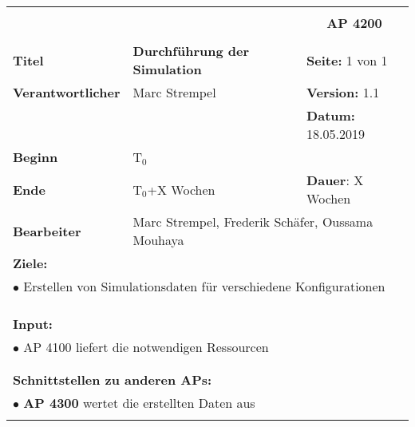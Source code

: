 \clearpage
\begin{table}[!h]
 \begin{center}
  \begin{tabular}{|p{35mm}||p{55mm}|p{50mm}||p{40mm}|}
   \hline
   \multicolumn{3}{|l||}{\textbf{}} & \multicolumn{1}{c|}{}\\
   \multicolumn{3}{|l||}{\textbf{}} & \multicolumn{1}{c|}{\textbf{AP 4200}}\\
   \multicolumn{3}{|l||}{\textbf{}} & \multicolumn{1}{c|}{}\\
   \hline\hline
   \textbf{Titel} & \multicolumn{2}{p{7cm}||}{\textbf{Durchführung der Simulation}} & \textbf{Seite:} 1 von 1\\
   \hline
   \textbf{Verantwortlicher} & \multicolumn{2}{l||}{Marc Strempel} & \textbf{Version:} 1.1\\
   \hline
   \multicolumn{3}{|l||}{} & \textbf{Datum:} 18.05.2019\\
   \hline\hline
   \textbf{Beginn} & \multicolumn{2}{l||}{T$_0$} & \\
   \hline
   \textbf{Ende} & \multicolumn{2}{l||}{T$_0$+X Wochen} & \textbf{Dauer}: X Wochen\\
   \hline\hline
   \textbf{Bearbeiter} & \multicolumn{3}{l|}{Marc Strempel, Frederik Schäfer, Oussama Mouhaya}\\
   \hline\hline
   \multicolumn{4}{|p{150mm}|}{\textbf{Ziele:}}\\
   \multicolumn{4}{|p{150mm}|}{$\bullet$ Erstellen von Simulationsdaten für verschiedene Konfigurationen}\\
   \multicolumn{4}{|p{150mm}|}{}\\
   \multicolumn{4}{|p{150mm}|}{}\\
   \multicolumn{4}{|p{150mm}|}{}\\
   \multicolumn{4}{|p{150mm}|}{\textbf{Input:}}\\
   \multicolumn{4}{|p{150mm}|}{$\bullet$ AP 4100 liefert die notwendigen Ressourcen}\\
   \multicolumn{4}{|p{150mm}|}{}\\
   \multicolumn{4}{|p{150mm}|}{}\\
   \multicolumn{4}{|p{150mm}|}{\textbf{Schnittstellen zu anderen APs:}}\\
   \multicolumn{4}{|p{150mm}|}{$\bullet$ \textbf{AP 4300} wertet die erstellten Daten aus}\\
   \multicolumn{4}{|p{150mm}|}{}\\

\end{tabular}
\end{center}
\end{table}
